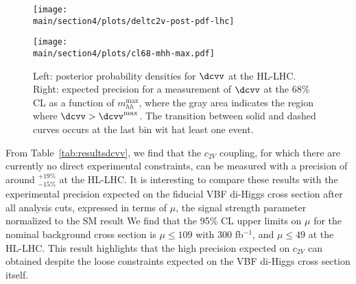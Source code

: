 \begin{figure}[h!]
	\centering
	\begin{minipage}{0.49\textwidth}\centering
		\texttt{[image: \\main/section4/plots/deltc2v-post-pdf-lhc]}
	\end{minipage}
	\begin{minipage}{0.49\textwidth}\centering
		\texttt{[image: \\main/section4/plots/cl68-mhh-max.pdf]}
	\end{minipage}
	\caption{\small Left: posterior probability densities for $\dcvv$ at the HL-LHC.
		Right: expected
		precision for a measurement of $\dcvv$ at the 68\% CL
		as a function of $m_{hh}^{\max}$, where
		the gray area indicates the region where $\dcvv > \dcvv^\text{max}$.
		The transition between solid and dashed curves occurs at the last bin wit hat least one event.
	}
	\label{fig:post-pdf} 
\end{figure}

From Table~\ref{tab:resultsdcvv}, we find that the $c_{2V}$ coupling, for which
there are currently no direct experimental constraints, can be measured 
with a precision of
around  $_{-15\%}^{+19\%}$ at the HL-LHC. 
%
It is interesting to compare these results with the experimental precision
expected on the fiducial VBF di-Higgs cross section after all
analysis cuts, expressed in terms of $\mu$, the signal strength parameter normalized to the SM result 
%
We find that the 95\% CL upper limits on $\mu$ for the nominal background cross section
is $\mu\le 109$ with 300 fb$^{-1}$, and $\mu\le 49$ at the HL-LHC.
%
This result highlights  that the high precision expected on
$c_{2V}$ can obtained despite the loose constraints expected
on the VBF di-Higgs cross section itself.

